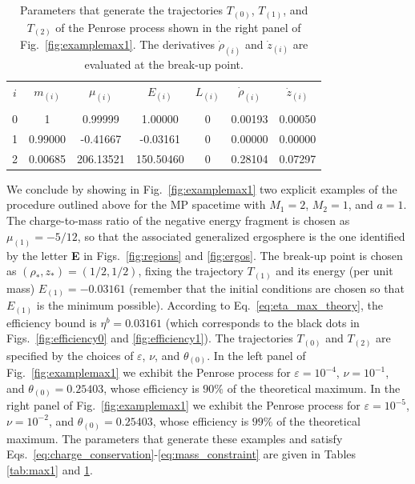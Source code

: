 \begin{table}[h]
  \centering
  \begin{tabular}{ccccccc}
    \hline\hline
    $i$ & $m_{(i)}$ & $\mu_{(i)}$ & $E_{(i)}$ & $L_{(i)}$ & $\dot{\rho}_{(i)}$ & $\dot{z}_{(i)}$ \\ \vspace{-0.3cm} \\
    0   & 1         & 0.99999     & 1.00000   & 0         & 0.00193            & 0.00050         \\
    1   & 0.99000   & -0.41667    & -0.03161  & 0         & 0.00000            & 0.00000         \\
    2   & 0.00685   & 206.13521   & 150.50460 & 0         & 0.28104            & 0.07297         \\
    \hline\hline
  \end{tabular}
  \caption{Parameters that generate the trajectories $T_{(0)}$, $T_{(1)}$, and $T_{(2)}$ of the Penrose process shown in the right panel of Fig.~\ref{fig:examplemax1}. The derivatives $\dot{\rho}_{(i)}$ and $\dot{z}_{(i)}$ are evaluated at the break-up point.
  }
  \label{tab:max2}
\end{table}

We conclude by showing in Fig.~\ref{fig:examplemax1} two explicit examples of the procedure outlined above for the MP spacetime with $M_1=2$, $M_2=1$, and $a=1$. The charge-to-mass ratio of the negative energy fragment is chosen as $\mu_{(1)}=-5/12$, so that the associated generalized ergosphere is the one identified by the letter \textbf{E} in Figs.~\ref{fig:regions} and \ref{fig:ergos}. The  break-up point is chosen as $(\rho_*,z_*)=(1/2,1/2)$, fixing the trajectory $T_{(1)}$ and its energy (per unit mass) $E_{(1)}=-0.03161$ (remember that the initial conditions are chosen so that $E_{(1)}$ is the minimum possible). According to Eq.~\eqref{eq:eta_max_theory}, the efficiency bound is $\eta^{b} = 0.03161$ (which corresponds to the black dots in Figs.~\ref{fig:efficiency0} and \ref{fig:efficiency1}). The trajectories $T_{(0)}$ and $T_{(2)}$ are specified by the choices of $\varepsilon$, $\nu$, and $\theta_{(0)}$. In the left panel of Fig.~\ref{fig:examplemax1}  we exhibit the Penrose process for $\varepsilon=10^{-4}$, $\nu=10^{-1}$, and $\theta_{(0)}=0.25403$, whose efficiency is $90 \%$ of the theoretical maximum. In the right panel of Fig.~\ref{fig:examplemax1} we exhibit the Penrose process for $\varepsilon=10^{-5}$, $\nu=10^{-2}$, and $\theta_{(0)}=0.25403$, whose efficiency is $99 \%$ of the theoretical maximum. The parameters that generate these examples and satisfy Eqs.~\eqref{eq:charge_conservation}-\eqref{eq:mass_constraint} are  given in Tables \ref{tab:max1} and \ref{tab:max2}.